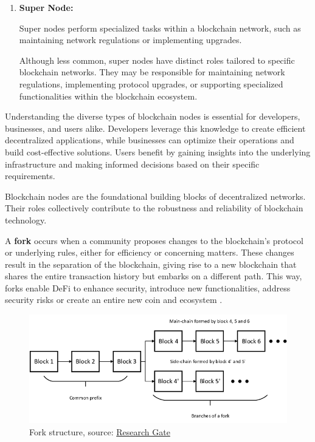 \begin{enumerate}
    \item \textbf{Super Node:}

    Super nodes perform specialized tasks within a blockchain network, such as maintaining network regulations or implementing upgrades.

    Although less common, super nodes have distinct roles tailored to specific blockchain networks. They may be responsible for maintaining network regulations, implementing protocol upgrades, or supporting specialized functionalities within the blockchain ecosystem.\newline
\end{enumerate}

Understanding the diverse types of blockchain nodes is essential for developers, businesses, and users alike. Developers leverage this knowledge to create efficient decentralized applications, while businesses can optimize their operations and build cost-effective solutions. Users benefit by gaining insights into the underlying infrastructure and making informed decisions based on their specific requirements.\newline

Blockchain nodes are the foundational building blocks of decentralized networks. Their roles collectively contribute to the robustness and reliability of blockchain technology.\newline


A \textbf{fork} occurs when a community proposes changes to the blockchain's protocol or underlying rules, either for efficiency or concerning matters. These changes result in the separation of the blockchain, giving rise to a new blockchain that shares the entire transaction history but embarks on a different path. This way, forks enable DeFi to enhance security, introduce new functionalities, address security risks or create an entire new coin and ecosystem \cite{fork}.


\begin{figure}[htbp]
	\centering
	\includegraphics[scale=0.4]{figures/fork.png}  %
	\caption{Fork structure, source: \href{https://www.researchgate.net/figure/Fork-structure-in-a-blockchain_fig2_342017074}{Research Gate}}
	\label{fig:fork}
\end{figure}

